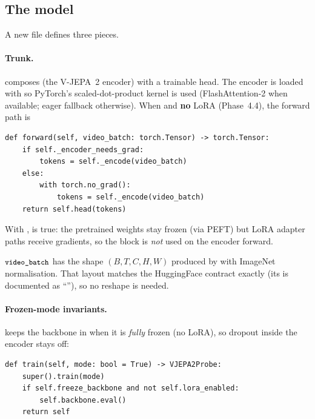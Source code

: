 \subsection{The  model}
\label{sec:trackb:model}

A new file  defines three pieces.

\paragraph{Trunk.}  composes
 (the V-JEPA~2 encoder) with a
trainable head. The encoder is loaded with
 so PyTorch's scaled-dot-product kernel
is used (FlashAttention-2 when available; eager fallback otherwise).
When  and \textbf{no} LoRA (Phase~4.4), the
forward path is
\begin{lstlisting}[style=py]
def forward(self, video_batch: torch.Tensor) -> torch.Tensor:
    if self._encoder_needs_grad:
        tokens = self._encode(video_batch)
    else:
        with torch.no_grad():
            tokens = self._encode(video_batch)
    return self.head(tokens)
\end{lstlisting}
With ,  is true:
the pretrained weights stay frozen (via PEFT) but LoRA adapter paths
receive gradients, so the  block is \emph{not} used
on the encoder forward.

\(\texttt{\small video\_batch}\) has the shape \((B, T, C, H, W)\) produced by
 with ImageNet normalisation. That layout
matches the HuggingFace  contract exactly
(its  is documented as
``''), so no reshape is needed.

\paragraph{Frozen-mode invariants.}  keeps
the backbone in  when it is \emph{fully} frozen (no LoRA), so
dropout inside the encoder stays off:

\begin{lstlisting}[style=py]
def train(self, mode: bool = True) -> VJEPA2Probe:
    super().train(mode)
    if self.freeze_backbone and not self.lora_enabled:
        self.backbone.eval()
    return self
\end{lstlisting}

